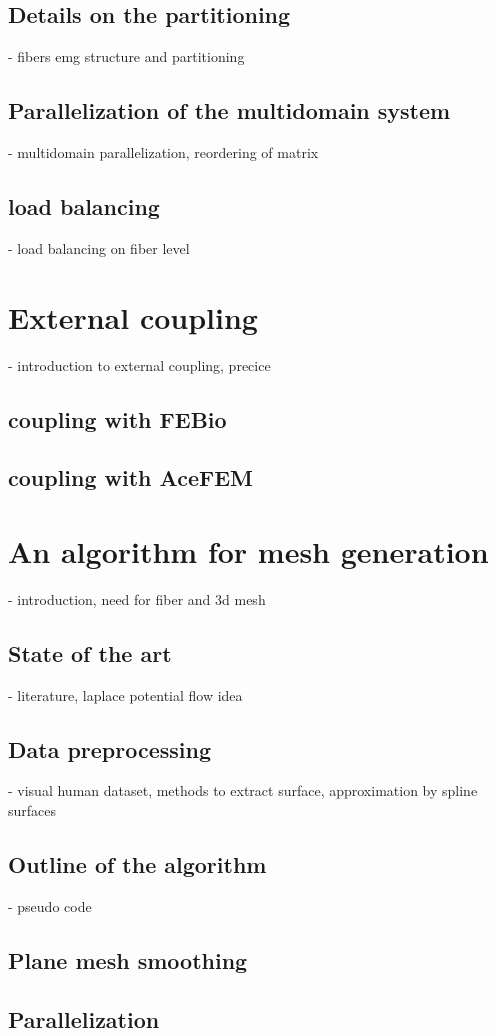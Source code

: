    \section{Details on the partitioning}
    - fibers emg structure and partitioning
    \section{Parallelization of the multidomain system}
    - multidomain parallelization, reordering of matrix
    \section{load balancing}
    - load balancing on fiber level
  \chapter{External coupling}
    - introduction to external coupling, precice
    \section{coupling with FEBio}
    \section{coupling with AceFEM}
  
  \chapter{An algorithm for mesh generation}
    - introduction, need for fiber and 3d mesh
    \section{State of the art}
    - literature, laplace potential flow idea
    \section{Data preprocessing}
    - visual human dataset, methods to extract surface, approximation by spline surfaces
    \section{Outline of the algorithm}
    - pseudo code
    \section{Plane mesh smoothing}
    \section{Parallelization}
